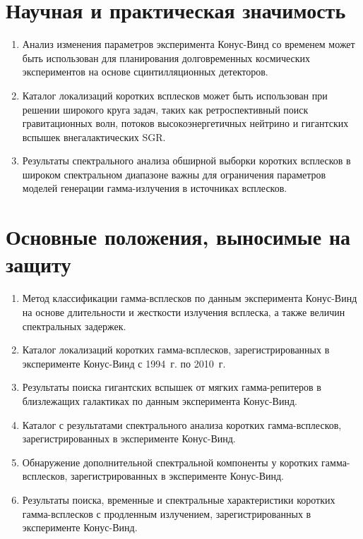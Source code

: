 \section*{Научная и практическая значимость}

\begin{enumerate}
\item Анализ изменения параметров эксперимента Конус-Винд со временем может быть использован
 для планирования долговременных космических экспериментов на основе сцинтилляционных детекторов.
\item Каталог локализаций коротких всплесков может быть использован при решении 
 широкого круга задач, таких как ретроспективный поиск гравитационных волн, потоков высокоэнергетичных нейтрино 
 и гигантских вспышек внегалактических SGR.
\item Результаты спектрального анализа обширной выборки коротких всплесков 
в широком спектральном диапазоне важны для ограничения параметров
моделей генерации гамма-излучения в источниках всплесков.
\end{enumerate}

\section*{Основные положения, выносимые на защиту}

\begin{enumerate}
\item Метод классификации гамма-всплесков по данным эксперимента Конус-Винд на основе
    длительности и жесткости излучения всплеска, а также величин спектральных задержек.
\item Каталог локализаций коротких гамма-всплесков, зарегистрированных в эксперименте
    Конус-Винд с 1994~г. по 2010~г.
\item Результаты поиска гигантских вспышек от мягких гамма-репитеров 
    в близлежащих галактиках по данным эксперимента Конус-Винд. 
\item Каталог с результатами спектрального анализа коротких гамма-всплесков, 
    зарегистрированных в эксперименте Конус-Винд.
\item Обнаружение дополнительной спектральной компоненты у коротких гамма-всплесков, 
    зарегистрированных в эксперименте Конус-Винд.
\item Результаты поиска, временные и спектральные характеристики коротких гамма-всплесков 
    с продленным излучением, зарегистрированных в эксперименте Конус-Винд.
\end{enumerate}

